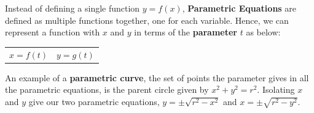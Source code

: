         \begin{center}
        \end{center}

        \noindent Instead of defining a single function $y=f(x)$, \textbf{Parametric Equations} are
        defined as multiple functions together, one for each variable. Hence, we can represent a
        function with $x$ and $y$ in terms of the \textbf{parameter} $t$ as below:

        \begin{center}
            \begin{tabular} {cc}
                $x=f(t)$ & $y=g(t)$
            \end{tabular}
        \end{center}

        \noindent An example of a \textbf{parametric curve}, the set of points the parameter gives
        in all the parametric equations, is the parent circle given by $x^2+y^2=r^2$. Isolating $x$
        and $y$ give our two parametric equations, $y=\pm\sqrt{r^2-x^2}$ and $x=\pm\sqrt{r^2-y^2}$. \\

